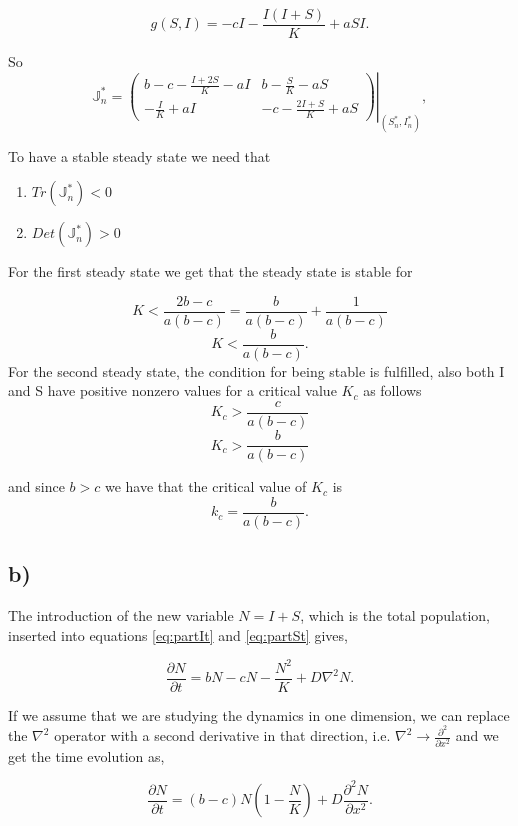 \begin{equation}
g(S,I)=-cI-\frac{I(I+S)}{K}+aSI.
\end{equation}

So
\begin{equation}
\mathbb{J}^*_n=\left.\left(
\begin{array}{cc}
b-c-\frac{I+2S}{K}-aI & b-\frac{S}{K}-aS \\
-\frac{I}{K} +aI & -c -\frac{2I+S}{K}+aS
\end{array}\right)\right|_{(S^*_n,I^*_n)},
\end{equation}

To have a stable steady state we need that 

\begin{enumerate}
\item $Tr(\mathbb{J}^*_n)<0$
\item $Det(\mathbb{J}^*_n)>0$
\end{enumerate}


For the first steady state we get that the steady state is stable for

$$
K<\frac{2b-c}{a(b-c)}=\frac{b}{a(b-c)}+\frac{1}{a(b-c)}
$$$$
K<\frac{b}{a(b-c)}.
$$
For the second steady state, the condition for being stable is fulfilled, also both I and S have positive nonzero values for a critical value $K_c$ as follows
$$
K_c>\frac{c}{a(b-c)}
$$$$
K_c>\frac{b}{a(b-c)}
$$

and since $b>c$ we have that the critical value of $K_c$ is
\begin{equation}
k_c=\frac{b}{a(b-c)}.
\end{equation}
\subsection*{b)}

The introduction of the new variable $N=I+S$, which is the total population, inserted into equations \eqref{eq:partIt} and \eqref{eq:partSt} gives,

\begin{equation}
\frac{\partial N}{\partial t}=bN -cN -\frac{N^2}{K}+D\nabla^2N.
\end{equation}

If we assume that we are studying the dynamics in one dimension, we can replace the $\nabla^2$ operator with a second derivative in that direction, i.e. $\nabla^2\rightarrow \frac{\partial^2}{\partial x^2}$ and we get the time evolution as,

\begin{equation}
\frac{\partial N}{\partial t}=(b-c)N\left(1-\frac{N}{K}\right)+D\frac{\partial^2 N}{\partial x^2}.
\end{equation}

